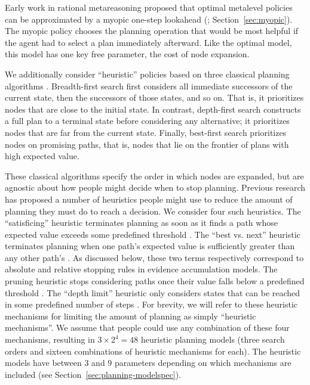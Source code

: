 Early work in rational metareasoning proposed that optimal metalevel policies can be approximated by a myopic one-step lookahead (\citealp{russell1991principles}; Section~\ref{sec:myopic}). The myopic policy chooses the planning operation that would be most helpful if the agent had to select a plan immediately afterward. Like the optimal model, this model has one key free parameter, the cost of node expansion.

We additionally consider ``heuristic'' policies based on three classical planning algorithms \citep{russell2002artificial}. Breadth-first search first considers all immediate successors of the current state, then the successors of those states, and so on. That is, it prioritizes nodes that are close to the initial state. In contrast, depth-first search constructs a full plan to a terminal state before considering any alternative; it prioritizes nodes that are far from the current state. Finally, best-first search prioritizes nodes on promising paths, that is, nodes that lie on the frontier of plans with high expected value.

These classical algorithms specify the order in which nodes are expanded, but are agnostic about how people might decide when to stop planning. Previous research has proposed a number of heuristics people might use to reduce the amount of planning they must do to reach a decision. We consider four such heuristics. The ``satisficing'' heuristic terminates planning as soon as it finds a path whose expected value exceeds some predefined threshold \citep{simon1955behavioral}. The ``best vs. next'' heuristic terminates planning when one path's expected value is sufficiently greater than any other path's \citep{solway2015evidence}. As discussed below, these two terms respectively correspond to absolute and relative stopping rules in evidence accumulation models. The pruning heuristic stops considering paths once their value falls below a predefined threshold \citep{huys2012bonsai}. The ``depth limit'' heuristic only considers states that can be reached in some predefined number of steps \citep{macgregor2001information,keramati2016adaptive,krusche2018adaptive,snider2015prospective}. For brevity, we will refer to these heuristic mechanisms for limiting the amount of planning as simply ``heuristic mechanisms''. We assume that people could use any combination of these four mechanisms, resulting in $3 \times 2^4 = 48$ heuristic planning models (three search orders and sixteen combinations of heuristic mechanisms for each). The heuristic models have between $3$ and $9$ parameters depending on which mechanisms are included (see Section~\ref{sec:planning-modelspec}).

